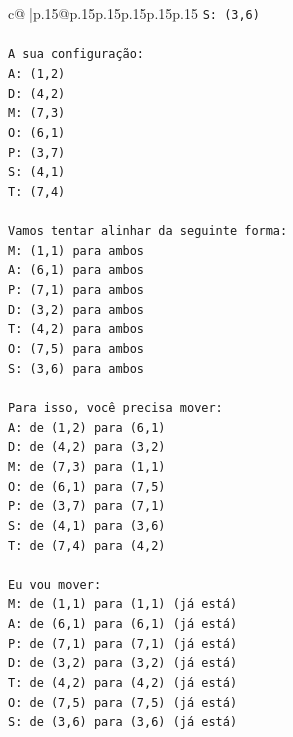 \documentclass{article}
\begin{document}
{\begin{supertabular}{c@{$\;$}|p{.15\linewidth}@{}p{.15\linewidth}p{.15\linewidth}p{.15\linewidth}p{.15\linewidth}p{.15\linewidth}}
{{{\texttt{S: (3,6)} \\
\\ 
\texttt{A sua configuração:} \\
\texttt{A: (1,2)} \\
\texttt{D: (4,2)} \\
\texttt{M: (7,3)} \\
\texttt{O: (6,1)} \\
\texttt{P: (3,7)} \\
\texttt{S: (4,1)} \\
\texttt{T: (7,4)} \\
\\ 
\texttt{Vamos tentar alinhar da seguinte forma:} \\
\texttt{M: (1,1) para ambos} \\
\texttt{A: (6,1) para ambos} \\
\texttt{P: (7,1) para ambos} \\
\texttt{D: (3,2) para ambos} \\
\texttt{T: (4,2) para ambos} \\
\texttt{O: (7,5) para ambos} \\
\texttt{S: (3,6) para ambos} \\
\\ 
\texttt{Para isso, você precisa mover:} \\
\texttt{A: de (1,2) para (6,1)} \\
\texttt{D: de (4,2) para (3,2)} \\
\texttt{M: de (7,3) para (1,1)} \\
\texttt{O: de (6,1) para (7,5)} \\
\texttt{P: de (3,7) para (7,1)} \\
\texttt{S: de (4,1) para (3,6)} \\
\texttt{T: de (7,4) para (4,2)} \\
\\ 
\texttt{Eu vou mover:} \\
\texttt{M: de (1,1) para (1,1) (já está)} \\
\texttt{A: de (6,1) para (6,1) (já está)} \\
\texttt{P: de (7,1) para (7,1) (já está)} \\
\texttt{D: de (3,2) para (3,2) (já está)} \\
\texttt{T: de (4,2) para (4,2) (já está)} \\
\texttt{O: de (7,5) para (7,5) (já está)} \\
\texttt{S: de (3,6) para (3,6) (já está)} \\
}}}
\end{supertabular}}
\end{document}
